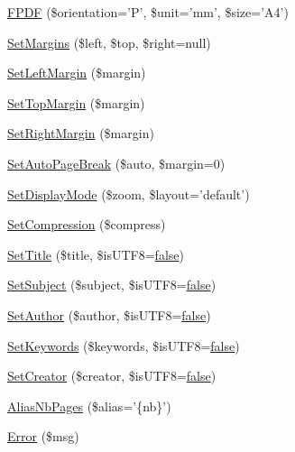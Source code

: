 \begin{DoxyCompactItemize}
\item 
\hyperlink{class_f_p_d_f_a38d6260bf42d1c581416bd5a23a3f850}{F\-P\-D\-F} (\$orientation='P', \$unit='mm', \$size='A4')
\item 
\hyperlink{class_f_p_d_f_a03ee8480b6a0b9362820d225c309f603}{Set\-Margins} (\$left, \$top, \$right=null)
\item 
\hyperlink{class_f_p_d_f_a64306dab17b5156dbb09151818ebf98b}{Set\-Left\-Margin} (\$margin)
\item 
\hyperlink{class_f_p_d_f_aeb7511c3d686e2aa9f9496f1b1ec147f}{Set\-Top\-Margin} (\$margin)
\item 
\hyperlink{class_f_p_d_f_a1008ef2dbf448c60dd2f9324bcc6601a}{Set\-Right\-Margin} (\$margin)
\item 
\hyperlink{class_f_p_d_f_a55c2e62a11e10dd7bc0c8aa089ba1c5e}{Set\-Auto\-Page\-Break} (\$auto, \$margin=0)
\item 
\hyperlink{class_f_p_d_f_aa0695aab6e2889198e94a48b87ddaae6}{Set\-Display\-Mode} (\$zoom, \$layout='default')
\item 
\hyperlink{class_f_p_d_f_ab56cc065fff6c44c473c7f0428876486}{Set\-Compression} (\$compress)
\item 
\hyperlink{class_f_p_d_f_a8a8a4c77944aae4ac0219fefbe53b494}{Set\-Title} (\$title, \$is\-U\-T\-F8=\hyperlink{ttfontsuni_8php_afbaa04e5cc97693dc668b3c45d3dd740}{false})
\item 
\hyperlink{class_f_p_d_f_a29e614b472d76809a7f24d8382b2aec8}{Set\-Subject} (\$subject, \$is\-U\-T\-F8=\hyperlink{ttfontsuni_8php_afbaa04e5cc97693dc668b3c45d3dd740}{false})
\item 
\hyperlink{class_f_p_d_f_a2448f729ffdee950dca638910a31a206}{Set\-Author} (\$author, \$is\-U\-T\-F8=\hyperlink{ttfontsuni_8php_afbaa04e5cc97693dc668b3c45d3dd740}{false})
\item 
\hyperlink{class_f_p_d_f_a97c034e7f4c04395a54f09f582544a97}{Set\-Keywords} (\$keywords, \$is\-U\-T\-F8=\hyperlink{ttfontsuni_8php_afbaa04e5cc97693dc668b3c45d3dd740}{false})
\item 
\hyperlink{class_f_p_d_f_ad528c02fc9104993d5b8c4d3f4a5ae00}{Set\-Creator} (\$creator, \$is\-U\-T\-F8=\hyperlink{ttfontsuni_8php_afbaa04e5cc97693dc668b3c45d3dd740}{false})
\item 
\hyperlink{class_f_p_d_f_a519cf01024f5981364ec7cd2d5281253}{Alias\-Nb\-Pages} (\$alias='\{nb\}')
\item 
\hyperlink{class_f_p_d_f_abbf9af8630c425b22b9199cc906ee1bb}{Error} (\$msg)
\item 

\end{DoxyCompactItemize}
